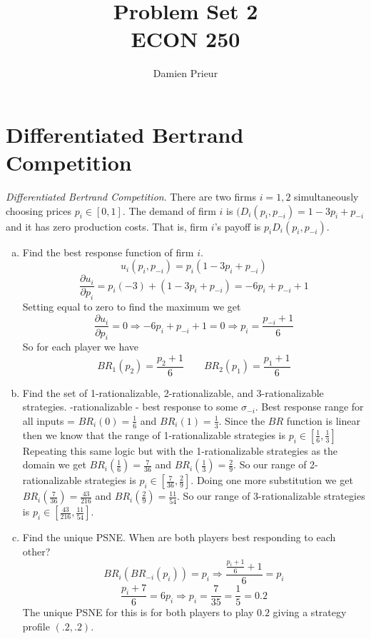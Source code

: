 \documentclass{article}
\author{Damien Prieur}
\title{Problem Set 2 \\ ECON 250}
\date{}
\begin{document}
\maketitle

\section{Differentiated Bertrand Competition}
\emph{Differentiated Bertrand Competition}.
There are two firms $i = 1, 2$ simultaneously choosing prices $p_{i} \in [0,1]$.
The demand of firm $i$ is $(D_{i}(p_{i},p_{-i})= 1-3p_{i} + p_{-i}$ and it has zero production costs.
That is, firm $i$'s payoff is $p_{i}D_{i}(p_{i},p_{-i})$.

\begin{enumerate}[(a)]

\item Find the best response function of firm $i$.
\newline
$$u_{i}(p_{i},p_{-i}) = p_{i} ( 1 - 3p_{i} + p_{-i})$$
$$\frac{\partial u_{i}}{\partial p_{i}} = p_{i}(-3) + (1-3p_{i}+p_{-i}) = -6p_{i} + p_{-i} + 1$$
Setting equal to zero to find the maximum we get
$$ \frac{\partial u_{i}}{\partial p_{i}} = 0 \Rightarrow -6p_{i} + p_{-i} + 1 = 0 \Rightarrow p_{i} = \frac{p_{-i} + 1}{6}$$
So for each player we have
$$ BR_{1}(p_2) = \frac{p_2+1}{6} \qquad BR_{2}(p_1) = \frac{p_1+1}{6}$$

\item Find the set of 1-rationalizable, 2-rationalizable, and 3-rationalizable strategies.
-rationalizable - best response to some $\sigma_{-i}$.
Best response range for all inputs = $BR_{i}(0) = \frac{1}{6}$ and $BR_{i}(1) = \frac{1}{3}$.
Since the $BR$ function is linear then we know that the range of 1-rationalizable strategies is $p_{i}\in[\frac{1}{6}, \frac{1}{3}]$
\newline
Repeating this same logic but with the 1-rationalizable strategies as the domain we get $BR_{i}(\frac{1}{6}) = \frac{7}{36}$ and $BR_{i}(\frac{1}{3}) = \frac{2}{9}$.
So our range of 2-rationalizable strategies is $p_{i} \in [\frac{7}{36},\frac{2}{9}]$.
\newline
Doing one more substitution we get $BR_{i}(\frac{7}{36}) = \frac{43}{216}$ and $BR_{i}(\frac{2}{9}) = \frac{11}{54}$.
So our range of 3-rationalizable strategies is $p_{i} \in [\frac{43}{216},\frac{11}{54}]$.

\item Find the unique PSNE.
\newline
When are both players best responding to each other? \\
$$ BR_{i}(BR_{-i}(p_{i})) = p_{i} \Rightarrow \frac{\frac{p_{i} + 1}{6} + 1}{6} = p_{i} $$
$$\frac{p_{i} + 7}{6} = 6p_{i} \Rightarrow p_{i} = \frac{7}{35} = \frac{1}{5} = 0.2$$
The unique PSNE for this is for both players to play $0.2$ giving a strategy profile $(.2,.2)$.
\end{enumerate}
\end{document}
